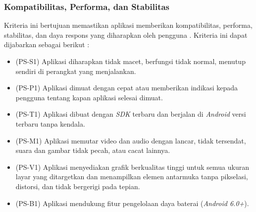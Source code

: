\subsubsection{Kompatibilitas, Performa, dan Stabilitas}
Kriteria ini bertujuan memastikan aplikasi memberikan kompatibilitas, performa, stabilitas, dan daya respons yang diharapkan oleh pengguna \cite{androiddev}. Kriteria ini dapat dijabarkan sebagai berikut : 
\begin{itemize}
    \item (PS-S1) Aplikasi diharapkan tidak macet, berfungsi tidak normal, menutup sendiri di perangkat yang menjalankan.
    \item (PS-P1) Aplikasi dimuat dengan cepat atau memberikan indikasi kepada pengguna tentang kapan aplikasi selesai dimuat.
    \item (PS-T1) Aplikasi dibuat dengan \textit{SDK} terbaru dan berjalan di \textit{Android} versi terbaru tanpa kendala.
    \item (PS-M1) Aplikasi memutar video dan audio dengan lancar, tidak tersendat, suara dan gambar tidak pecah, atau cacat lainnya.
    \item (PS-V1) Aplikasi menyediakan grafik berkualitas tinggi untuk semua ukuran layar yang ditargetkan dan menampilkan elemen antarmuka tanpa pikselasi, distorsi, dan tidak bergerigi pada tepian.
    \item (PS-B1) Aplikasi mendukung fitur pengelolaan daya baterai (\textit{Android 6.0+}).  
\end{itemize}   

